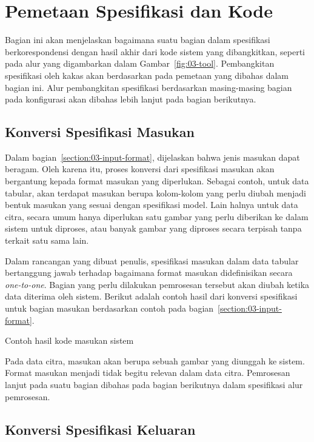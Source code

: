 \section{Pemetaan Spesifikasi dan Kode}

Bagian ini akan menjelaskan bagaimana suatu bagian dalam spesifikasi berkorespondensi dengan hasil akhir dari kode sistem yang dibangkitkan, seperti pada alur yang digambarkan dalam Gambar~\ref{fig:03-tool}.
Pembangkitan spesifikasi oleh kakas akan berdasarkan pada pemetaan yang dibahas dalam bagian ini.
Alur pembangkitan spesifikasi berdasarkan masing-masing bagian pada konfigurasi akan dibahas lebih lanjut pada bagian berikutnya.

\subsection{Konversi Spesifikasi Masukan}

Dalam bagian~\ref{section:03-input-format}, dijelaskan bahwa jenis masukan dapat beragam.
Oleh karena itu, proses konversi dari spesifikasi masukan akan bergantung kepada format masukan yang diperlukan.
Sebagai contoh, untuk data tabular, akan terdapat masukan berupa kolom-kolom yang perlu diubah menjadi bentuk masukan yang sesuai dengan spesifikasi model.
Lain halnya untuk data citra, secara umum hanya diperlukan satu gambar yang perlu diberikan ke dalam sistem untuk diproses, atau banyak gambar yang diproses secara terpisah tanpa terkait satu sama lain.

Dalam rancangan yang dibuat penulis, spesifikasi masukan dalam data tabular bertanggung jawab terhadap bagaimana format masukan didefinisikan secara \textit{one-to-one}.
Bagian yang perlu dilakukan pemrosesan tersebut akan diubah ketika data diterima oleh sistem.
Berikut adalah contoh hasil dari konversi spesifikasi untuk bagian masukan berdasarkan contoh pada bagian~\ref{section:03-input-format}.

\begin{listing}[H]
	\caption{Contoh hasil kode masukan sistem}
	\label{listing:10}
\end{listing}

Pada data citra, masukan akan berupa sebuah gambar yang diunggah ke sistem.
Format masukan menjadi tidak begitu relevan dalam data citra.
Pemrosesan lanjut pada suatu bagian dibahas pada bagian berikutnya dalam spesifikasi alur pemrosesan. 

\subsection{Konversi Spesifikasi Keluaran}

